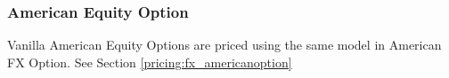 \subsubsection{American Equity Option}
\label{pricing:eq_americanoption}

Vanilla American Equity Options are priced using the same model in
American FX Option. See Section \ref{pricing:fx_americanoption}